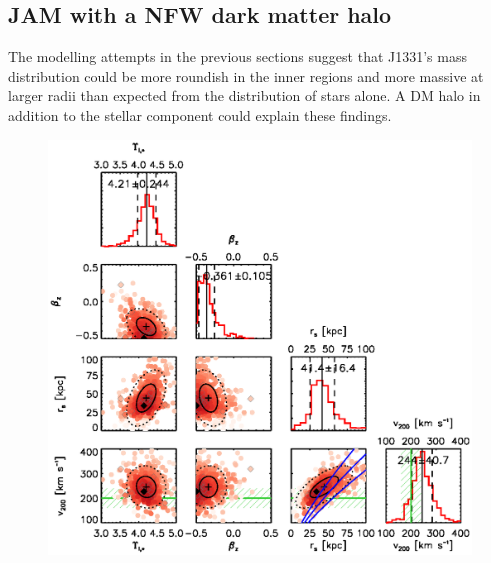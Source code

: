 \subsection{JAM with a NFW dark matter halo} \label{sec:results_JAM_NFW}

The modelling attempts in the previous sections suggest that J1331's mass distribution could be more roundish in the inner regions and more massive at larger radii than expected from the distribution of stars alone. A DM halo in addition to the stellar component could explain these findings. 

\begin{figure}
\centering
\includegraphics[width=0.9\linewidth]{fig/B4_contour_plot_short.ps}

\end{figure}
